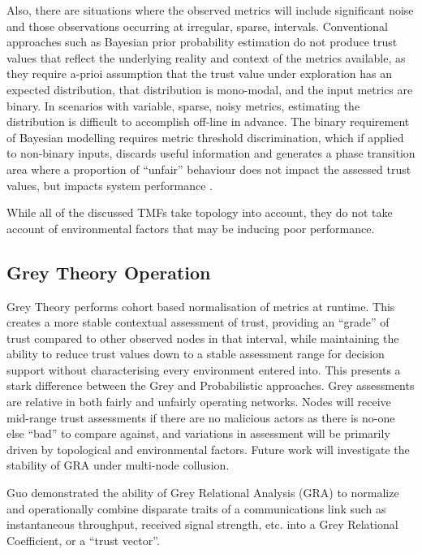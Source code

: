 \documentclass[runningheads,a4paper]{llncs}
\begin{document}
Also, there are situations where the observed metrics will include significant noise and those observations occurring at irregular, sparse, intervals.
Conventional approaches such as Bayesian prior probability estimation do not produce trust values that reflect the underlying reality and context of the metrics available, as they require a-prioi assumption that the trust value under exploration has an expected distribution, that distribution is mono-modal, and the input metrics are binary.
In scenarios with variable, sparse, noisy metrics, estimating the distribution is difficult to accomplish off-line in advance.
The binary requirement of Bayesian modelling requires metric threshold discrimination, which if applied to non-binary inputs, discards useful information and generates a phase transition area where a proportion of ``unfair'' behaviour does not impact the assessed trust values, but impacts system performance \cite{Mundinger2008}.

While all of the discussed TMFs take topology into account, they do not take account of environmental factors that may be inducing poor performance.

\subsection{Grey Theory Operation}

Grey Theory performs cohort based normalisation of metrics at runtime. 
This creates a more stable contextual assessment of trust, providing an ``grade'' of trust compared to other observed nodes in that interval, while maintaining the ability to reduce trust values down to a stable assessment range for decision support without characterising every environment entered into.
This presents a stark difference between the Grey and Probabilistic approaches.
Grey assessments are relative in both fairly and unfairly operating networks.
Nodes will receive mid-range trust assessments if there are no malicious actors as there is no-one else ``bad'' to compare against, and variations in assessment will be primarily driven by topological and environmental factors.
Future work will investigate the stability of GRA under multi-node collusion.

Guo\cite{Guo2012} demonstrated the ability of Grey Relational Analysis (GRA)\cite{Zuo1995} to normalize and operationally combine disparate traits of a communications link such as instantaneous throughput, received signal strength, etc. into a Grey Relational Coefficient, or a ``trust vector''.
\end{document}
